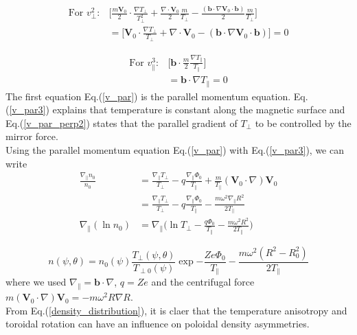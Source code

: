 \begin{equation}
\begin{split}
    \text{For} \,\, v_\perp^2 : &\big[\frac{m\bm{V}_0}{2} \cdot \frac{\nabla T_\perp}{T_\perp^2} + \frac{\nabla \cdot \bm{V}_0}{2}\frac{m}{T_\perp} - \frac{(\bm{b} \cdot \nabla \bm{V}_0 \cdot \bm{b})}{2}\frac{m}{T_\perp}\big] \\
    &= \boxed{\big[ \bm{V}_0 \cdot \frac{\nabla T_\perp}{T_\perp} + \nabla \cdot \bm{V}_0 -(\bm{b} \cdot \nabla \bm{V}_0 \cdot \bm{b}) \big]=0}
    \label{v_perp2}
\end{split}
\end{equation}

\begin{equation}
\begin{split}
    \text{For} \,\, v_\parallel^3 : &\Big[\bm{b} \cdot \frac{m}{2}\frac{\nabla T_\parallel}{T_\parallel}\Big] \\
    &= \boxed{\bm{b} \cdot \nabla T_\parallel = 0}
    \label{v_par3}
\end{split}
\end{equation}
The first equation Eq.(\ref{v_par}) is the parallel momentum equation. Eq.(\ref{v_par3}) explains that temperature is constant along the magnetic surface and Eq.(\ref{v_par_perp2}) states that the parallel gradient of $T_\perp$ to be controlled by the mirror force. \\
Using the parallel momentum equation Eq.(\ref{v_par}) with Eq.(\ref{v_par3}), we can write 
\begin{equation}
\begin{split}
    \frac{\nabla_\parallel n_0}{n_0} &= \frac{\nabla_\parallel T_\perp}{T_\perp} -q\frac{\nabla_\parallel \Phi_0}{T_\parallel}+\frac{m}{T_\parallel}(\bm{V}_0 \cdot \nabla)\bm{V}_0 \\
    &= \frac{\nabla_\parallel T_\perp}{T_\perp} -q\frac{\nabla_\parallel \Phi_0}{T_\parallel}-\frac{m\omega^2\nabla_\parallel R^2}{2T_\parallel} \\
    \nabla_\parallel(\ln{n_0})&=\nabla_\parallel \Big( \ln{T_\perp} - \frac{q\Phi_0}{T_\parallel}-\frac{m\omega^2R^2}{2T_\parallel}\Big)
\end{split}
\end{equation}

\begin{equation}
    \boxed{n(\psi,\theta) = n_0(\psi)\frac{T_\perp(\psi,\theta)}{T_{\perp 0}(\psi)}\exp{-\frac{Ze\Phi_0}{T_\parallel}-\frac{m\omega^2(R^2-R_0^2)}{2T_\parallel}}}
\label{density_distribution}
\end{equation}
where we used $\nabla_\parallel = \bm{b} \cdot \nabla$, $q=Ze$ and the centrifugal force $m(\bm{V}_0 \cdot \nabla)\bm{V}_0=-m \omega^2 R\nabla R$. \\
From Eq.(\ref{density_distribution}), it is claer that the temperature anisotropy and toroidal rotation can have an influence on poloidal density asymmetries.